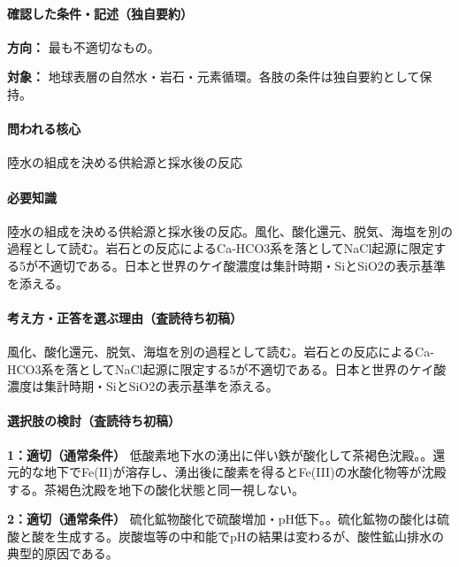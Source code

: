 \paragraph{確認した条件・記述（独自要約）}\mbox{}\par

\noindent\textbf{方向：} 最も不適切なもの。\par

\noindent\textbf{対象：} 地球表層の自然水・岩石・元素循環。各肢の条件は独自要約として保持。\par

\paragraph{問われる核心} 陸水の組成を決める供給源と採水後の反応

\paragraph{必要知識} 陸水の組成を決める供給源と採水後の反応。風化、酸化還元、脱気、海塩を別の過程として読む。岩石との反応によるCa-HCO3系を落としてNaCl起源に限定する5が不適切である。日本と世界のケイ酸濃度は集計時期・SiとSiO2の表示基準を添える。

\paragraph{考え方・正答を選ぶ理由（査読待ち初稿）} 風化、酸化還元、脱気、海塩を別の過程として読む。岩石との反応によるCa-HCO3系を落としてNaCl起源に限定する5が不適切である。日本と世界のケイ酸濃度は集計時期・SiとSiO2の表示基準を添える。

\paragraph{選択肢の検討（査読待ち初稿）}\mbox{}\par

\noindent\textbf{1：適切（通常条件）} 低酸素地下水の湧出に伴い鉄が酸化して茶褐色沈殿。。還元的な地下でFe(II)が溶存し、湧出後に酸素を得るとFe(III)の水酸化物等が沈殿する。茶褐色沈殿を地下の酸化状態と同一視しない。\par

\noindent\textbf{2：適切（通常条件）} 硫化鉱物酸化で硫酸増加・pH低下。。硫化鉱物の酸化は硫酸と酸を生成する。炭酸塩等の中和能でpHの結果は変わるが、酸性鉱山排水の典型的原因である。\par


